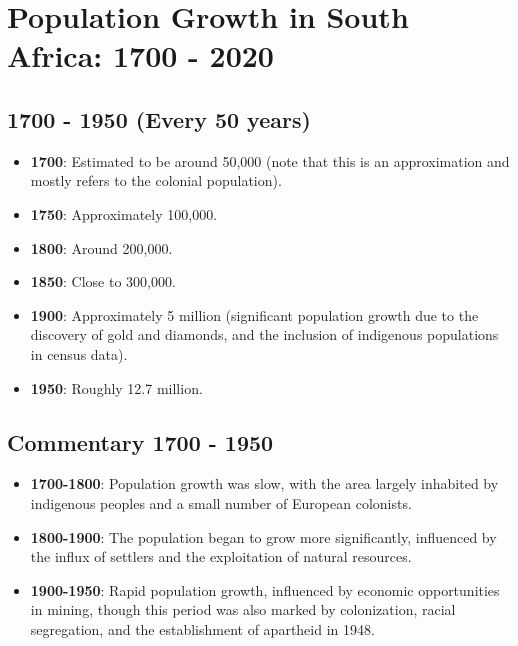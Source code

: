 \section{Population Growth in South Africa: 1700 - 2020}

\subsection*{1700 - 1950 (Every 50 years)}
\begin{itemize}
    \item \textbf{1700}: Estimated to be around 50,000 (note that this is an approximation and mostly refers to the colonial population).
    \item \textbf{1750}: Approximately 100,000.
    \item \textbf{1800}: Around 200,000.
    \item \textbf{1850}: Close to 300,000.
    \item \textbf{1900}: Approximately 5 million (significant population growth due to the discovery of gold and diamonds, and the inclusion of indigenous populations in census data).
    \item \textbf{1950}: Roughly 12.7 million.
\end{itemize}

\subsection*{Commentary 1700 - 1950}
\begin{itemize}
    \item \textbf{1700-1800}: Population growth was slow, with the area largely inhabited by indigenous peoples and a small number of European colonists.
    \item \textbf{1800-1900}: The population began to grow more significantly, influenced by the influx of settlers and the exploitation of natural resources.
    \item \textbf{1900-1950}: Rapid population growth, influenced by economic opportunities in mining, though this period was also marked by colonization, racial segregation, and the establishment of apartheid in 1948.
\end{itemize}

